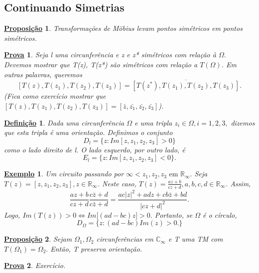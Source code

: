 \documentclass{article}
\newtheorem*{def*}{\underline{Defini\c c\~ao}}
\newtheorem{example}{\underline{Exemplo}}[section]
\newtheorem*{proof*}{\underline{Prova}}
\newtheorem*{prop*}{\underline{Proposi\c c\~ao}}
\begin{document}
  \subsection{Continuando Simetrias}
  \begin{prop*}
    Transforma\c c\~oes de M\"{o}bius levam pontos sim\'etricos em pontos sim\'etricos.
  \end{prop*}
  \begin{proof*}
    Seja l uma circunfer\^encia e z e z* sim\'etricos com rela\c c\~ao \`a $\Omega.$  Devemos mostrar que T(z), T(z*) s\~ao sim\'etricos
    com rela\c c\~ao a $T(\Omega)$. Em outras palavras, queremos 
    $$
    [T(z), T(z_{1}), T(z_2), T(z_3)] = \overline{[T(z^*), T(z_1), T(z_2), T(z_3)]}.
    $$
    (Fica como exerc\'icio mostrar que $[T(z), T(z_{1}), T(z_2), T(z_3)] = [\bar{z}, \bar{z_1}, \bar{z_2}, \bar{z_3}]$).
  \end{proof*}
  \begin{def*}
    Dada uma circunfer\^encia $\Omega$ e uma tripla $z_{i}\in \Omega, i = 1, 2, 3,$ dizemos que esta tripla \'e uma orienta\c c\~ao.
    Definimos o conjunto
    $$
    D_{l} = \{z: Im[z, z_1, z_2, z_3] > 0\}
    $$
    como o lado direito de l. O lado esquerdo, por outro lado, \'e 
    $$
    E_{l} = \{z: Im[z, z_1, z_2, z_3] < 0\}.
    $$
  \end{def*}
  \begin{example}
    Um circuito passando por $\infty < z_1, z_2, z_3\text{ em }\mathbb{R}_\infty.$ Seja $T(z) = [z, z_1, z_2, z_3], z\in \mathbb{R}_\infty$. 
    Neste caso, $T(z) = \frac{az + b}{cz + d}, a, b, c, d\in \mathbb{R}_\infty$. Assim, 
    $$
    \frac{az + b}{cz + d}\frac{c\bar{z} + d}{c\bar{z} + d} = \frac{ac|z|^2 + adz + cb\bar{z} + bd}{|cz+d|^2}.
    $$
    Logo, $Im(T(z)) > 0\Longleftrightarrow Im\biggl[(ad-bc)z\biggr] > 0.$ Portanto, se $\Omega$ \'e o c\'irculo,
    $$ 
    D_{\Omega} = \{z: (ad - bc)Im(z) > 0.\}
    $$
  \end{example}
  \begin{prop*}
    Sejam $\Omega_1, \Omega_2$ circunfer\^encias em $\mathbb{C}_\infty$ e T uma TM com $T(\Omega_1) = \Omega_2.$ Ent\~ao, T preserva
    orienta\c c\~ao.
  \end{prop*}
  \begin{proof*}
    Exerc\'icio.
  \end{proof*}
\end{document}
